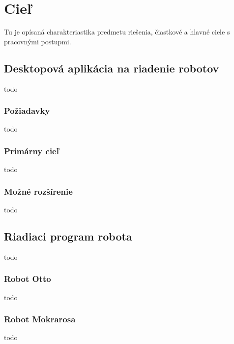 \chapter{Cieľ}

\label{kap:ciel}

Tu je opísaná charakteriastika predmetu riešenia, čiastkové a hlavné ciele s pracovnými postupmi.

\section{Desktopová aplikácia na riadenie robotov}
todo

\subsection{Požiadavky}
todo

\subsection{Primárny cieľ}
todo

\subsection{Možné rozšírenie}
todo

\section{Riadiaci program robota}
todo

\subsection{Robot Otto}
todo

\subsection{Robot Mokrarosa}
todo
